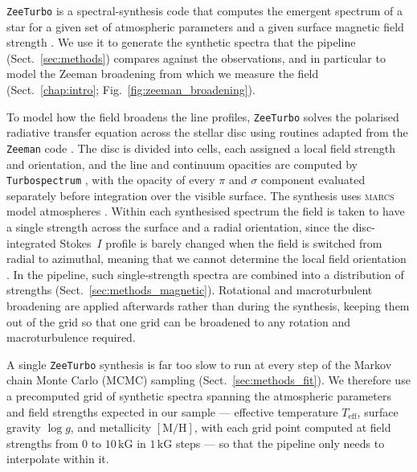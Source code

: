 
\texttt{ZeeTurbo} is a spectral-synthesis code that computes the emergent spectrum of a star for a given set of atmospheric parameters and a given surface magnetic field strength \citep{cristofari_2023a}. We use it to generate the synthetic spectra that the pipeline (Sect.~\ref{sec:methods}) compares against the observations, and in particular to model the Zeeman broadening from which we measure the field (Sect.~\ref{chap:intro}; Fig.~\ref{fig:zeeman_broadening}).

To model how the field broadens the line profiles, \texttt{ZeeTurbo} solves the polarised radiative transfer equation across the stellar disc using routines adapted from the \texttt{Zeeman} code \citep{landstreet+1988, wade+2001, folsom+2016}. The disc is divided into cells, each assigned a local field strength and orientation, and the line and continuum opacities are computed by \texttt{Turbospectrum} \citep{alvarez_plez+1998, plez_2012}, with the opacity of every $\pi$ and $\sigma$ component evaluated separately before integration over the visible surface. The synthesis uses \textsc{marcs} model atmospheres \citep{gustafsson+2008}. Within each synthesised spectrum the field is taken to have a single strength across the surface and a radial orientation, since the disc-integrated Stokes~$I$ profile is barely changed when the field is switched from radial to azimuthal, meaning that we cannot determine the local field orientation \citep{Kochukhov_2021}. In the pipeline, such single-strength spectra are combined into a distribution of strengths (Sect.~\ref{sec:methods_magnetic}). Rotational and macroturbulent broadening are applied afterwards rather than during the synthesis, keeping them out of the grid so that one grid can be broadened to any rotation and macroturbulence required.

A single \texttt{ZeeTurbo} synthesis is far too slow to run at every step of the Markov chain Monte Carlo (MCMC) sampling (Sect.~\ref{sec:methods_fit}). We therefore use a precomputed grid of synthetic spectra spanning the atmospheric parameters and field strengths expected in our sample --- effective temperature $T_\mathrm{eff}$, surface gravity $\log g$, and metallicity $\mathrm{[M/H]}$, with each grid point computed at field strengths from $0$ to $10\,\mathrm{kG}$ in $1\,\mathrm{kG}$ steps --- so that the pipeline only needs to interpolate within it.


